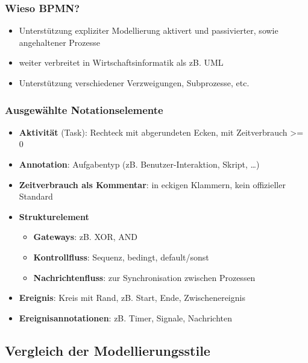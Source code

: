 \documentclass{article}
\begin{document}
\subsubsection{Wieso BPMN?}
\begin{itemize}
  \item Unterstützung expliziter Modellierung aktivert und passivierter, sowie angehaltener Prozesse
  \item weiter verbreitet in Wirtschaftsinformatik als zB. UML
  \item Unterstützung verschiedener Verzweigungen, Subprozesse, etc.
\end{itemize}

\subsubsection{Ausgewählte Notationselemente}
\begin{itemize}
  \item \textbf{Aktivität} (Task): Rechteck mit abgerundeten Ecken, mit Zeitverbrauch >= 0
  \item \textbf{Annotation}: Aufgabentyp (zB. Benutzer-Interaktion, Skript, …)
  \item \textbf{Zeitverbrauch als Kommentar}: in eckigen Klammern, kein offizieller Standard
  \item \textbf{Strukturelement}
        \begin{itemize}
          \item \textbf{Gateways}: zB. XOR, AND
          \item \textbf{Kontrollfluss}: Sequenz, bedingt, default/sonst
          \item \textbf{Nachrichtenfluss}: zur Synchronisation zwischen Prozessen
        \end{itemize}
  \item \textbf{Ereignis}: Kreis mit Rand, zB. Start, Ende, Zwischenereignis
  \item \textbf{Ereignisannotationen}: zB. Timer, Signale, Nachrichten
\end{itemize}

\subsection{Vergleich der Modellierungsstile}

\end{document}
